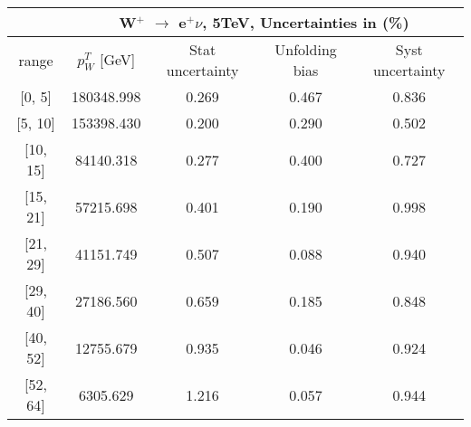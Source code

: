 \documentclass[12pt]{article}
\begin{document}
 
\begin{table}[] 
\begin{tabular}{c|c|c|c|c|}
\cline{2-5}
& \multicolumn{4}{c|}{W$^{+}$ $\rightarrow$ e$^{+} \nu $, 5TeV, Uncertainties in (\%)}  \\ \hline \hline 
\multicolumn{1}{|c|}{  range } & $p^{T}_{W}$ [GeV]     & Stat uncertainty     & Unfolding bias     & Syst uncertainty        \\ \hline \hline 
\multicolumn{1}{|c|}{{[}0,  5{]}}  & 180348.998 & 0.269 & 0.467 & 0.836 \\ \hline 
\multicolumn{1}{|c|}{{[}5,  10{]}}  & 153398.430 & 0.200 & 0.290 & 0.502 \\ \hline 
\multicolumn{1}{|c|}{{[}10,  15{]}}  & 84140.318 & 0.277 & 0.400 & 0.727 \\ \hline 
\multicolumn{1}{|c|}{{[}15,  21{]}}  & 57215.698 & 0.401 & 0.190 & 0.998 \\ \hline 
\multicolumn{1}{|c|}{{[}21,  29{]}}  & 41151.749 & 0.507 & 0.088 & 0.940 \\ \hline 
\multicolumn{1}{|c|}{{[}29,  40{]}}  & 27186.560 & 0.659 & 0.185 & 0.848 \\ \hline 
\multicolumn{1}{|c|}{{[}40,  52{]}}  & 12755.679 & 0.935 & 0.046 & 0.924 \\ \hline 
\multicolumn{1}{|c|}{{[}52,  64{]}}  & 6305.629 & 1.216 & 0.057 & 0.944 \\ \hline 
\end{tabular}
\end{table}
\end{document}
